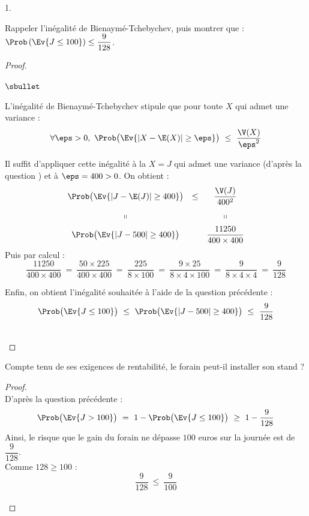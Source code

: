 \documentclass[11pt]{article}%
\begin{document}
\begin{noliste}{1.}
\item Rappeler l'inégalité de Bienaymé-Tchebychev, puis montrer que :
  $\Prob\left(\Ev{J \leq 100}\right) \leq \dfrac{9}{128}$.

  \begin{proof}~%
    \begin{noliste}{$\sbullet$}
    \item L'inégalité de Bienaymé-Tchebychev stipule que pour toute
      \var $X$ qui admet une variance :
      \[
      \forall \eps > 0, \ \Prob\big( \Ev{|X - \E(X)| \geq \eps} \big)
      \ \leq \ \dfrac{\V(X)}{\eps^2}
      \]
      
    \item Il suffit d'appliquer cette inégalité à la \var $X = J$ qui
      admet une variance (d'après la question ) et à $\eps =
      400 > 0$. On obtient :
      \[
      \begin{array}{cccc}
        \Prob\big( \Ev{|J - \E(J)| \geq 400} \big) & \leq &
        \dfrac{\V(J)}{400^2} 
        \\[.4cm]
        \shortparallel & & \shortparallel
        \\[.2cm]
        \Prob\big( \Ev{|J - 500| \geq 400} \big) & &
        \dfrac{11250}{400 \times 400}        
      \end{array}        
      \]
      Puis par calcul :
      \[
      \dfrac{11250}{400 \times 400} \ = \ \dfrac{50 \times 225}{400
        \times 400} \ = \ \dfrac{225}{8\times 100} \ = \ \dfrac{9
        \times 25}{8\times 4 \times 100} \ = \ \dfrac{9}{8\times 4
        \times 4} \ = \ \dfrac{9}{128}
      \]

    \item Enfin, on obtient l'inégalité souhaitée à l'aide de la
      question précédente :
      \[
      \Prob\big(\Ev{ J \leq 100}\big) \ \leq \ \Prob\big( \Ev{|J-500|\geq
        400} \big) \ \leq \ \dfrac{9}{128}
      \]
    \end{noliste}
    ~\\[-1cm]
  \end{proof}

\item Compte tenu de ses exigences de rentabilité, le forain peut-il
  installer son stand ?

  \begin{proof}~\\%
    D'après la question précédente :
    \[
    \Prob\big(\Ev{ J > 100}\big) \ = \ 1 - \Prob\big(\Ev{ J \leq
      100}\big) \ \geq \ 1 - \dfrac{9}{128}
    \]
    Ainsi, le risque que le gain du forain ne dépasse $100$ euros sur
    la journée est de $\dfrac{9}{128}$.\\
    Comme $128 \geq 100$ :
    \[
    \dfrac{9}{128} \ \leq \ \dfrac{9}{100}
    \]
    ~\\[-1cm]
  \end{proof}
\end{noliste}
\end{document}
